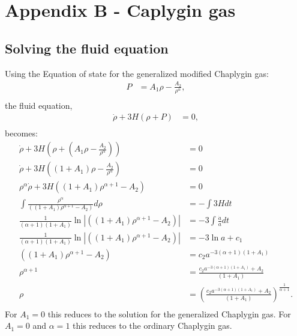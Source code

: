 \documentclass[a4paper, 11pt]{FSKH_623_Report}
\numberwithin{equation}{section}
\newcommand{\brac}[1]{\left(#1\right)}
\begin{document}
\section*{Appendix B - Caplygin gas}
\subsection*{Solving the fluid equation}
Using the Equation of state for the generalized modified Chaplygin gas:
\begin{equation}\label{eq:B1}
\begin{split}
P &=A_{1}\rho-\frac{A_{2}}{\rho^{\alpha}},         \\
\end{split}
\end{equation}
the fluid equation,
\begin{equation}\label{eq:B2}
\begin{split}
\dot{\rho}+3H\brac{\rho+P} &= 0,        \\
\end{split}
\end{equation}
becomes:
\begin{equation}\label{eq:B3}
\begin{split}
\dot{\rho}+3H\brac{\rho+\brac{A_{1}\rho-\frac{A_{2}}{\rho^{\alpha}}}} &= 0 \\
\dot{\rho}+3H\brac{\brac{1+A_{1}}\rho-\frac{A_{2}}{\rho^{\alpha}}} &= 0 \\
\rho^{\alpha}\dot{\rho}+3H\brac{\brac{1+A_{1}}\rho^{\alpha+1}-A_{2}} &= 0 \\
\int\frac{\rho^{\alpha}}{\brac{\brac{1+A_{1}}\rho^{\alpha+1}-A_{2}}}d\rho&=-\int3Hdt\\
\frac{1}{\brac{\alpha+1}\brac{1+A_{1}}}\ln\left|\brac{\brac{1+A_{1}}\rho^{\alpha+1}-A_{2}}\right|&=-3\int\frac{\dot{a}}{a}dt\\
\frac{1}{\brac{\alpha+1}\brac{1+A_{1}}}\ln\left|\brac{\brac{1+A_{1}}\rho^{\alpha+1}-A_{2}}\right|&=-3\ln a+c_{1}\\
\brac{\brac{1+A_{1}}\rho^{\alpha+1}-A_{2}}&=c_{2}a^{-3\brac{\alpha+1}\brac{1+A_{1}}}\\
\rho^{\alpha+1}&=\frac{c_{2}a^{-3\brac{\alpha+1}\brac{1+A_{1}}}+A_{2}}{\brac{1+A_{1}}}\\
\rho&=\brac{\frac{c_{2}a^{-3\brac{\alpha+1}\brac{1+A_{1}}}+A_{2}}{\brac{1+A_{1}}}}^{\frac{1}{\alpha+1}}.\\
\end{split}
\end{equation}
For $A_{1}=0$ this reduces to the solution for the generalized Chaplygin gas. For $A_{1}=0$ and $\alpha=1$ this reduces to the ordinary Chaplygin gas.
\end{document}
